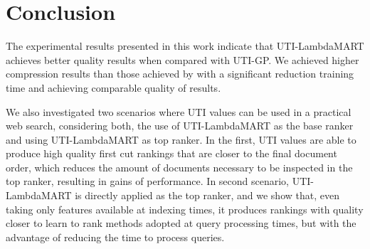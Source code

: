 \documentclass[preprint,review,10pt,3p]{elsarticle}
\begin{document}



\section{Conclusion}
The experimental results presented in this work indicate that UTI-LambdaMART achieves better quality results when compared with UTI-GP. We achieved higher compression results than those achieved by \cite{costa2012lepref} with a significant reduction training time and achieving comparable quality of results. 

We also investigated two scenarios where UTI values  can be used in a practical web search, considering both, the use of UTI-LambdaMART as the base  ranker and using UTI-LambdaMART as top ranker. In the first, UTI values are able to produce high quality first cut rankings that are closer to the final document order, which  reduces the amount of documents necessary to be inspected in the top ranker, resulting in gains of performance. In second scenario, UTI-LambdaMART is directly applied as the top ranker, and we show that, even taking only features available at indexing times, it produces rankings with quality closer  to learn to rank  methods adopted at query processing times, but with the advantage of reducing the time to process queries.

\label{conclusion}



% 
% 
% 
% 
% 
% 
% 
% 
% 
% 
% 
% 


\end{document}
